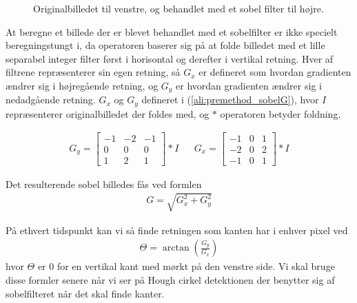 \begin{figure}[H]
\begin{minipage}[b]{0.5\linewidth}
	\end{minipage}
	\caption{Originalbilledet til venstre, og behandlet med et sobel filter til højre.\label{fig:premethod_sobelres}}
\end{figure}

At beregne et billede der er blevet behandlet med et sobelfilter er ikke specielt beregningstungt i, da operatoren baserer sig på at folde billedet med et lille separabel integer filter først i horisontal og derefter i vertikal retning. Hver af filtrene repræsenterer sin egen retning, så $G_x$ er defineret som hvordan gradienten ændrer sig i højregående retning, og $G_y$ er hvordan gradienten ændrer sig i nedadgående retning. $G_x$ og $G_y$ defineret i  (\ref{ali:premethod_sobelG}), hvor $I$ repræsenterer originalbilledet der foldes med, og $*$ operatoren betyder foldning.

\begin{align}
	G_y = \begin{bmatrix}
		-1 & -2 & -1\\
		0 & 0 & 0\\
		1 & 2 & 1
	\end{bmatrix} * I
	&&
	G_x = \begin{bmatrix}
		-1 & 0 & 1\\
		-2 & 0 & 2\\
		-1 & 0 & 1
	\end{bmatrix} * I
	\label{ali:premethod_sobelG}
\end{align} 

Det resulterende sobel billedes fås ved formlen 
\begin{align}
	G = \sqrt{G_x^2 + G_y^2}
\end{align}

På ethvert tidspunkt kan vi så finde retningen som kanten har i enhver pixel ved 
\begin{align}
	\Theta = \arctan\left(\frac{G_y}{G_x}\right)
	\label{ali:premethod_sobelTheta}
\end{align}
hvor $\Theta$ er 0 for en vertikal kant med mørkt på den venstre side. Vi skal bruge disse formler senere når vi ser på Hough cirkel detektionen der benytter sig af sobelfilteret når det skal finde kanter. 

